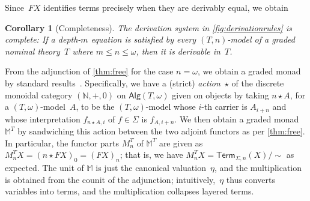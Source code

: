 \documentclass[11pt,a4paper]{amsart}
\newtheorem{corollary}[corollary]{Corollary}
\newcommand{\Alg}{\mathsf{Alg}}
\newcommand{\Term}{\mathsf{Term}}
\newcommand{\sig}{\Sigma}
\theoremstyle{plain}
\numberwithin{equation}{section}
\newcommand{\Nat}{{\mathbb{N}}}
\newcommand{\monad}{{\mathbb{M}}}
\newcommand{\+}[1]{\mathcal{#1}\xspace}
\theoremstyle{definition}
\begin{document}
\noindent Since~$FX$ identifies terms precisely when they are derivably
equal, we obtain
\begin{corollary}[Completeness]
  The derivation system in \cref{fig:derivationrules} is complete:
  If a depth-$m$ equation is satisfied by every \((T, n)\)-model of a
  graded nominal theory~$T$ where $m\le n\le\omega$, then it is
  derivable in~$T$.
\end{corollary}
\noindent From the adjunction of \cref{thm:free} for the case
$n=\omega$, we obtain a graded monad by standard
results~\cite[Section~3]{FujiiEA16}.  Specifically, we have a (strict) \emph{action}~$\star$
of the discrete monoidal category $(\Nat,+,0)$ on $\Alg(T,\omega)$
given on objects by taking $n\star A$, for a $(T,\omega)$-model~$A$,
to be the $(T,\omega)$-model whose $i$-th carrier is $A_{i+n}$ and whose
interpretation $f_{n\star A,i}$ of $f\in\sig$ is $f_{A,i+n}$. We then
obtain a graded monad $\monad^T$ by sandwiching this action between
the two adjoint functors as per \cref{thm:free}. In particular, the
functor parts $M^T_n$ of $\monad^T$ are given as
$M^T_nX=(n\star FX)_0=(FX)_n$; that is, we have $M^T_nX=\Term_{\Sigma,n}(X)/\sim$
as expected. The unit of $\monad$ is just the canonical
valuation~$\eta$, and the multiplication is obtained from the counit
of the adjunction; intuitively,~$\eta$ thus converts variables into
terms, and the multiplication collapses layered terms.
\end{document}
